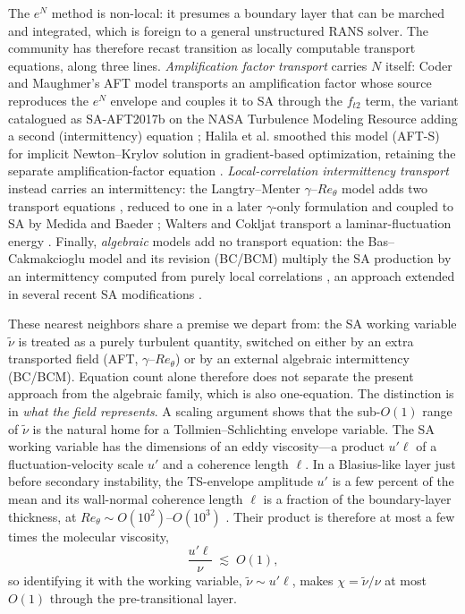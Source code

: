 \documentclass[journal]{new-aiaa}
\begin{document}
The $e^N$ method is non-local: it presumes a boundary layer that can be marched and
integrated, which is foreign to a general unstructured RANS solver. The community
has therefore recast transition as locally computable transport equations,
along three lines. \emph{Amplification factor transport} carries $N$ itself: Coder
and Maughmer's AFT model transports an amplification factor whose source reproduces
the $e^N$ envelope and couples it to SA through the $f_{t2}$ term, the variant
catalogued as SA-AFT2017b on the NASA Turbulence Modeling Resource adding a second
(intermittency) equation \cite{coder_maughmer_2014, nasa_tmr}; Halila et al.
smoothed this model (AFT-S) for implicit Newton--Krylov solution in
gradient-based optimization, retaining the separate amplification-factor equation
\cite{halila_2022}. \emph{Local-correlation intermittency transport} instead carries
an intermittency: the Langtry--Menter $\gamma$--$Re_\theta$ model adds two transport
equations \cite{menter_langtry_2006, langtry_menter_2009}, reduced to one in a later
$\gamma$-only formulation \cite{menter_gamma_2015} and coupled to SA by Medida and
Baeder \cite{medida_baeder_2011}; Walters and Cokljat transport a
laminar-fluctuation energy \cite{walters_cokljat_2008}. Finally, \emph{algebraic}
models add no transport equation: the Bas--Cakmakcioglu model and its
revision (BC/BCM) multiply the SA production by an intermittency computed from
purely local correlations \cite{cakmakcioglu_2018, cakmakcioglu_2020}, an approach
extended in several recent SA modifications \cite{rahman_2024, crivellini_2023}.

These nearest neighbors share a premise we depart from: the SA working
variable $\tilde\nu$ is treated as a purely turbulent quantity, switched on either
by an extra transported field (AFT, $\gamma$--$Re_\theta$) or by an external
algebraic intermittency (BC/BCM). Equation count alone therefore does not separate
the present approach from the algebraic family, which is also one-equation. The
distinction is in \emph{what the field represents}. A scaling argument shows that the sub-$O(1)$ range of $\tilde\nu$ is the
natural home for a Tollmien--Schlichting envelope variable. The SA working
variable has the dimensions of an eddy viscosity---a product $u'\ell$ of a
fluctuation-velocity scale $u'$ and a coherence length $\ell$. In a Blasius-like
layer just before secondary instability, the TS-envelope amplitude $u'$ is a few
percent of the mean and its wall-normal coherence length $\ell$ is a fraction of
the boundary-layer thickness, at $Re_\theta\!\sim\!O(10^2)$--$O(10^3)$
\cite{schmid_henningson_2001,abu_ghannam_shaw_1980}. Their product is therefore
at most a few times the molecular viscosity,
\begin{equation}
  \frac{u'\ell}{\nu}\;\lesssim\;O(1),
  \label{eq:scaling}
\end{equation}
so identifying it with the working variable, $\tilde\nu\!\sim\!u'\ell$, makes
$\chi\!=\!\tilde\nu/\nu$ at most $O(1)$ through the pre-transitional layer.
\end{document}
